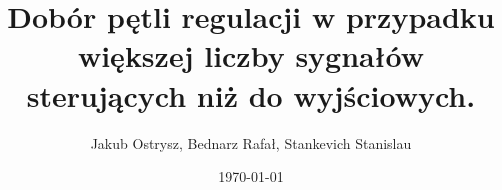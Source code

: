 \documentclass{beamer}
\title{Dobór pętli regulacji w przypadku większej liczby sygnałów sterujących niż do wyjściowych.}
\author{Jakub Ostrysz, Bednarz Rafał, Stankevich Stanislau}
\date{\today}
\begin{document}
\begin{frame}
    \titlepage 
\end{frame}








\end{document}

